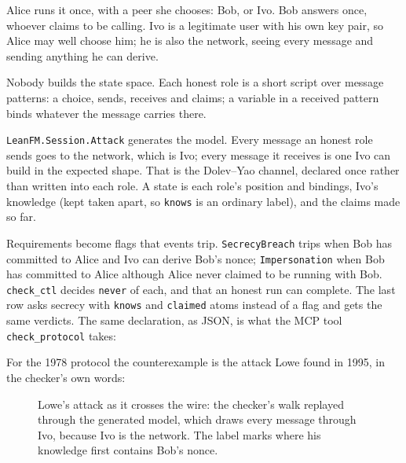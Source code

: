 

Alice runs it once, with a peer she chooses: Bob, or Ivo. Bob answers once,
whoever claims to be calling. Ivo is a legitimate user with his own key pair, so
Alice may well choose him; he is also the network, seeing every message and
sending anything he can derive.

Nobody builds the state space. Each honest role is a short script over message
patterns: a choice, sends, receives and claims; a variable in a received pattern
binds whatever the message carries there.



\texttt{LeanFM.Session.Attack} generates the model. Every message an honest role
sends goes to the network, which is Ivo; every message it receives is one Ivo can
build in the expected shape. That is the Dolev--Yao channel, declared once rather
than written into each role. A state is each role's position and bindings, Ivo's
knowledge (kept taken apart, so \texttt{knows} is an ordinary label), and the
claims made so far.

Requirements become flags that events trip. \texttt{SecrecyBreach} trips when Bob
has committed to Alice and Ivo can derive Bob's nonce; \texttt{Impersonation}
when Bob has committed to Alice although Alice never claimed to be running with
Bob. \texttt{check\_ctl} decides \texttt{never} of each, and that an honest run
can complete. The last row asks secrecy with \texttt{knows} and \texttt{claimed}
atoms instead of a flag and gets the same verdicts. The same declaration, as JSON,
is what the MCP tool \texttt{check\_protocol} takes:

\begin{center}

\end{center}

For the 1978 protocol the counterexample is the attack Lowe found in 1995, in the
checker's own words:



\begin{figure}[htbp]
\centering
\resizebox{\textwidth}{!}{}
\caption{Lowe's attack as it crosses the wire: the checker's walk replayed through the
generated model, which draws every message through Ivo, because Ivo is the network. The label
marks where his knowledge first contains Bob's nonce.}
\label{fig:lowe-attack}
\end{figure}

